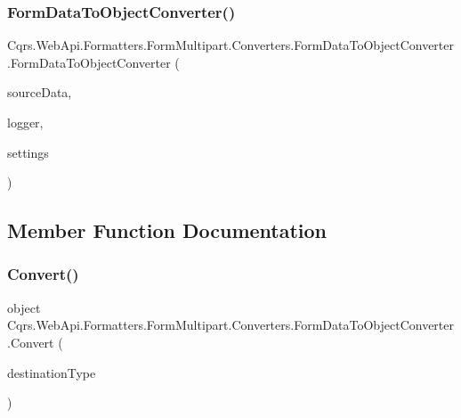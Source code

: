 \subsubsection{\texorpdfstring{Form\+Data\+To\+Object\+Converter()}{FormDataToObjectConverter()}}
{\footnotesize\ttfamily Cqrs.\+Web\+Api.\+Formatters.\+Form\+Multipart.\+Converters.\+Form\+Data\+To\+Object\+Converter.\+Form\+Data\+To\+Object\+Converter (\begin{DoxyParamCaption}\item[{\hyperlink{classCqrs_1_1WebApi_1_1Formatters_1_1FormMultipart_1_1Infrastructure_1_1FormData}{Form\+Data}}]{source\+Data,  }\item[{\hyperlink{interfaceCqrs_1_1WebApi_1_1Formatters_1_1FormMultipart_1_1Infrastructure_1_1Logger_1_1IFormDataConverterLogger}{I\+Form\+Data\+Converter\+Logger}}]{logger,  }\item[{\hyperlink{classCqrs_1_1WebApi_1_1Formatters_1_1FormMultipart_1_1Infrastructure_1_1MultipartFormatterSettings}{Multipart\+Formatter\+Settings}}]{settings }\end{DoxyParamCaption})}



\subsection{Member Function Documentation}
\mbox{\label{classCqrs_1_1WebApi_1_1Formatters_1_1FormMultipart_1_1Converters_1_1FormDataToObjectConverter_a1b3d45a20f48b1608a6a68796610c5aa_a1b3d45a20f48b1608a6a68796610c5aa}} 
\subsubsection{\texorpdfstring{Convert()}{Convert()}}
{\footnotesize\ttfamily object Cqrs.\+Web\+Api.\+Formatters.\+Form\+Multipart.\+Converters.\+Form\+Data\+To\+Object\+Converter.\+Convert (\begin{DoxyParamCaption}\item[{Type}]{destination\+Type }\end{DoxyParamCaption})}

